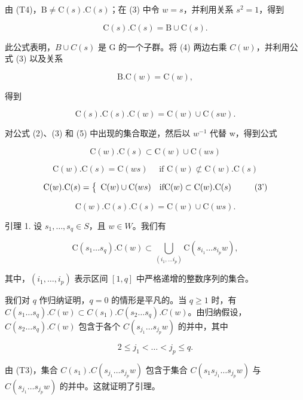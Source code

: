 由 (T4)，\(\mathrm{B} \neq \mathrm{C}(s). \mathrm{C}(s)\)；在 (3) 中令 \(w = s\)，并利用关系 \(s^2 = 1\)，得到

\[
\mathrm{C} (s). \mathrm{C} (s) = \mathrm{B} \cup \mathrm{C} (s).\tag{4}
\]

此公式表明，\(B \cup C(s)\) 是 G 的一个子群。将 (4) 两边右乘 \(C(w)\)，并利用公式 (3) 以及关系

\[
\mathrm{B.C} (w) = \mathrm{C} (w),
\]

得到

\[
\mathrm{C} (s). \mathrm{C} (s). \mathrm{C} (w) = \mathrm{C} (w) \cup \mathrm{C} (s w).\tag{5}
\]

对公式 (2)、(3) 和 (5) 中出现的集合取逆，然后以 \(w^{-1}\) 代替 w，得到公式

\[
\mathrm{C} (w). \mathrm{C} (s) \subset \mathrm{C} (w) \cup \mathrm{C} (w s)\tag{(2')}
\]

\[
\mathrm{C} (w). \mathrm{C} (s) = \mathrm{C} (w s) \quad \text {   if   } \mathrm{C} (w) \not \subset \mathrm{C} (w). \mathrm{C} (s)
\]

\[
\mathrm{C} (w). \mathrm{C} (s) = \left\{ \begin{array}{l l} \mathrm{C} (w) \cup \mathrm{C} (w s) & \text {if} \mathrm{C} (w) \subset \mathrm{C} (w). \mathrm{C} (s) \end{array} \right.\tag{3'}
\]

\[
\mathrm{C} (w). \mathrm{C} (s). \mathrm{C} (s) = \mathrm{C} (w) \cup \mathrm{C} (w s).\tag{(5')}
\]

引理 1. 设 \(s_1, \ldots, s_q \in S\)，且 \(w \in W\)。我们有

\[
\mathrm{C} \left(s _ {1} \dots s _ {q}\right). \mathrm{C} (w) \subset \bigcup_ {\left(i _ {1}, \dots i _ {p}\right)} \mathrm{C} \left(s _ {i _ {1}} \dots s _ {i _ {p}} w\right),
\]

其中，\((i_1, \ldots, i_p)\) 表示区间 \([1, q]\) 中严格递增的整数序列的集合。

我们对 \(q\) 作归纳证明，\(q = 0\) 的情形是平凡的。当 \(q \geqslant 1\) 时，有 \(C(s_1 \ldots s_q).C(w) \subset C(s_1).C(s_2 \ldots s_q).C(w)\)。由归纳假设，\(C(s_2 \ldots s_q).C(w)\) 包含于各个 \(C(s_{j_1} \ldots s_{j_p}w)\) 的并中，其中

\[
2 \leqslant j _ {1} <   \dots <   j _ {p} \leqslant q.
\]

由 (T3)，集合 \(C(s_{1}).C(s_{j_{1}}\ldots s_{j_{p}}w)\) 包含于集合 \(C(s_{1}s_{j_{1}}\ldots s_{j_{p}}w)\) 与 \(C(s_{j_{1}}\ldots s_{j_{p}}w)\) 的并中。这就证明了引理。

